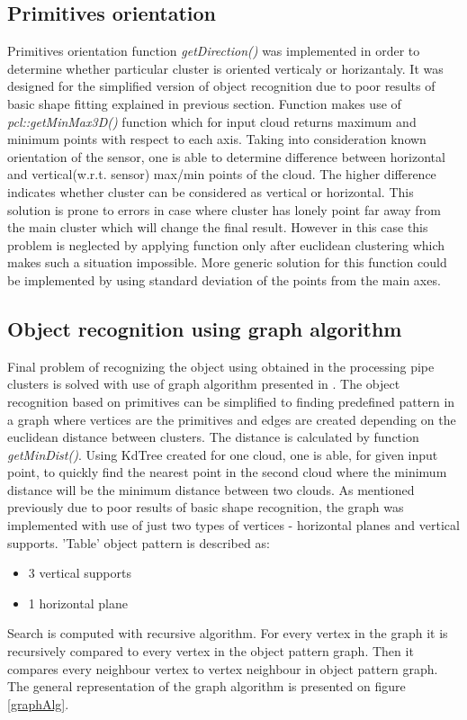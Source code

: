 \documentclass[fontsize=12pt]{article}
\begin{document}
\subsection{Primitives orientation}
Primitives orientation function \emph{getDirection()} was implemented in order to determine whether particular cluster is oriented verticaly or horizantaly. It was designed for the simplified version of object recognition due to poor results of basic shape fitting explained in previous section.\newline
\indent Function makes use of \emph{pcl::getMinMax3D()} function which for input cloud returns maximum and minimum points with respect to each axis. Taking into consideration known orientation of the sensor, one is able to determine difference between horizontal and vertical(w.r.t. sensor) max/min points of the cloud. The higher difference indicates whether cluster can be considered as vertical or horizontal. This solution is prone to errors in case where cluster has lonely point far away from the main cluster which will change the final result. However in this case this problem is neglected by applying function only after euclidean clustering which makes such a situation impossible. More generic solution for this function could be implemented by using standard deviation of the points from the main axes.

\subsection{Object recognition using graph algorithm}
Final problem of recognizing the object using obtained in the processing pipe clusters is solved with use of graph algorithm presented in \cite{graph}. The object recognition based on primitives can be simplified to finding predefined pattern in a graph where vertices are the primitives and edges are created depending on the euclidean distance between clusters. \newline
\indent The distance is calculated by function \emph{getMinDist()}. Using KdTree created for one cloud, one is able, for given input point, to quickly find the nearest point in the second cloud where the minimum distance will be the minimum distance between two clouds.\newline
\indent As mentioned previously due to poor results of basic shape recognition, the graph was implemented with use of just two types of vertices - horizontal planes and vertical supports. 'Table' object pattern is described as:
\begin{itemize}
  \item 3 vertical supports
  \item 1 horizontal plane
\end{itemize}
Search is computed with recursive algorithm. For every vertex in the graph it is recursively compared to every vertex in the object pattern graph. 
Then it compares every neighbour vertex to vertex neighbour in object pattern graph. The general representation of the graph algorithm is presented on figure \ref{graphAlg}.
\end{document}
